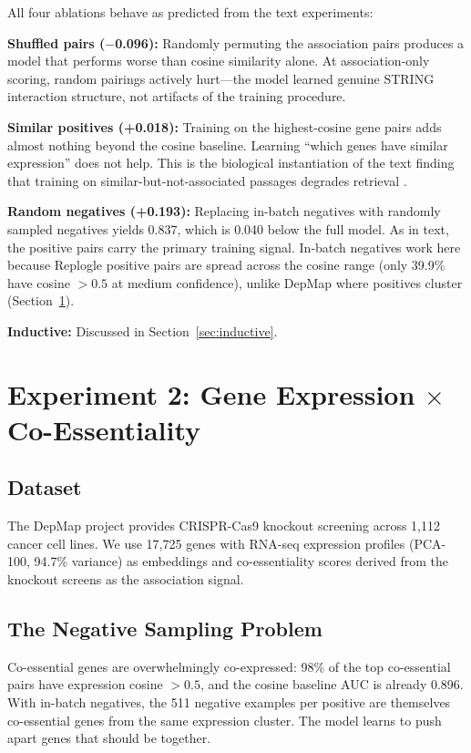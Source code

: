 \documentclass[11pt]{article}
\begin{document}
All four ablations behave as predicted from the text experiments:

\textbf{Shuffled pairs ($-$0.096):} Randomly permuting the association pairs produces a model that performs worse than cosine similarity alone. At association-only scoring, random pairings actively hurt---the model learned genuine STRING interaction structure, not artifacts of the training procedure.

\textbf{Similar positives (+0.018):} Training on the highest-cosine gene pairs adds almost nothing beyond the cosine baseline. Learning ``which genes have similar expression'' does not help. This is the biological instantiation of the text finding that training on similar-but-not-associated passages degrades retrieval \citep{dury2026aar}.

\textbf{Random negatives (+0.193):} Replacing in-batch negatives with randomly sampled negatives yields 0.837, which is 0.040 below the full model. As in text, the positive pairs carry the primary training signal. In-batch negatives work here because Replogle positive pairs are spread across the cosine range (only 39.9\% have cosine $> 0.5$ at medium confidence), unlike DepMap where positives cluster (Section~\ref{sec:depmap}).

\textbf{Inductive:} Discussed in Section~\ref{sec:inductive}.

\section{Experiment 2: Gene Expression $\times$ Co-Essentiality}
\label{sec:depmap}

\subsection{Dataset}

The DepMap project \citep{dempster2019depmap} provides CRISPR-Cas9 knockout screening across 1,112 cancer cell lines. We use 17,725 genes with RNA-seq expression profiles (PCA-100, 94.7\% variance) as embeddings and co-essentiality scores derived from the knockout screens as the association signal.

\subsection{The Negative Sampling Problem}

Co-essential genes are overwhelmingly co-expressed: 98\% of the top co-essential pairs have expression cosine $> 0.5$, and the cosine baseline AUC is already 0.896. With in-batch negatives, the 511 negative examples per positive are themselves co-essential genes from the same expression cluster. The model learns to push apart genes that should be together.
\end{document}
